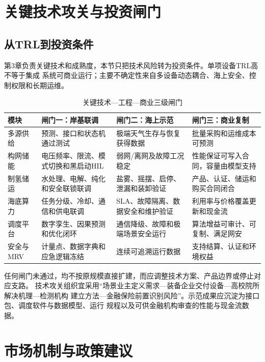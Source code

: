 \section{关键技术攻关与投资闸门}

\subsection{从TRL到投资条件}

第3章负责关键技术和成熟度，本节只把技术风险转为投资条件。单项设备TRL高不等于集成
系统可商业运行；主要不确定性来自多设备动态耦合、海上安全、控制权限和长期运维。

\begin{table}[H]
\centering
\caption{关键技术—工程—商业三级闸门}
\label{tab:c6-gates}
\footnotesize
\begin{tabularx}{\textwidth}{p{2.4cm} X X X}
\toprule
模块 & 闸门一：岸基联调 & 闸门二：海上示范 & 闸门三：商业复制\\
\midrule
多源供给 & 预测、接口和状态机通过测试 & 极端天气生存与恢复获得数据 & 批量采购和运维成本可预测\\
构网储能 & 电压频率、限流、模式切换和黑启动HIL & 弱网/离网及故障工况稳定 & 性能保证可写入合同，容量由模型支持\\
制氢储运 & 水处理、电解、纯化和安全联锁联调 & 盐雾、摇摆、启停、泄漏和装卸验证 & 产品、认证、储运和购买合同闭合\\
海底算力 & 任务分级、冷却、通信和供电联调 & SLA、故障隔离、数据安全和维护验证 & 利用率与价格覆盖更新和现金流\\
调度平台 & 数字孪生、因果预测和优化闭环 & 通信降级、故障和极端场景安全运行 & 算法增益可审计、可复制、满足网安\\
安全与MRV & 计量点、数据字典和应急逻辑冻结 & 连续可追溯运行数据 & 支持结算、认证和环境权益\\
\bottomrule
\end{tabularx}
\end{table}

任何闸门未通过，均不按原规模直接扩建，而应调整技术方案、产品边界或停止对应支路。
技术攻关组织宜采用“场景业主定义需求—装备企业交付设备—高校院所解决机理—检测机构
建立方法—金融保险前置识别风险”。示范成果应沉淀为接口包、调度软件与数据模型、运行
规程以及可供金融机构审查的性能与现金流数据。

\section{市场机制与政策建议}

